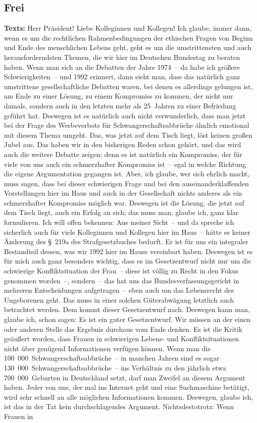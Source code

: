 \documentclass{article}
\begin{document}
\subsection{Frei}
\noindent\textbf{Texts:} Herr Präsident! Liebe Kolleginnen und Kollegen! Ich glaube, immer dann, wenn es um die rechtlichen Rahmenbedingungen der ethischen Fragen von Beginn und Ende des menschlichen Lebens geht, geht es um die umstrittensten und auch herausforderndsten Themen, die wir hier im Deutschen Bundestag zu beraten haben. Wenn man sich an die Debatten der Jahre 1974 – da habe ich größere Schwierigkeiten – und 1992 erinnert, dann sieht man, dass das natürlich ganz umstrittene gesellschaftliche Debatten waren, bei denen es allerdings gelungen ist, am Ende zu einer Lösung, zu einem Kompromiss zu kommen, der nicht nur damals, sondern auch in den letzten mehr als 25 Jahren zu einer Befriedung geführt hat. Deswegen ist es natürlich auch nicht verwunderlich, dass man jetzt bei der Frage des Werbeverbots für Schwangerschaftsabbrüche ähnlich emotional mit diesem Thema umgeht. Das, was jetzt auf dem Tisch liegt, löst keinen großen Jubel aus. Das haben wir in den bisherigen Reden schon gehört, und das wird auch die weitere Debatte zeigen; denn es ist natürlich ein Kompromiss, der für viele von uns auch ein schmerzhafter Kompromiss ist – egal in welche Richtung die eigene Argumentation gegangen ist. Aber, ich glaube, wer sich ehrlich macht, muss sagen, dass bei dieser schwierigen Frage und bei den auseinanderklaffenden Vorstellungen hier im Haus und auch in der Gesellschaft nichts anderes als ein schmerzhafter Kompromiss möglich war. Deswegen ist die Lösung, die jetzt auf dem Tisch liegt, auch ein Erfolg an sich; das muss man, glaube ich, ganz klar formulieren.  Ich will offen bekennen: Aus meiner Sicht – und da spreche ich sicherlich auch für viele Kolleginnen und Kollegen hier im Haus – hätte es keiner Änderung des § 219a des Strafgesetzbuches bedurft.  Er ist für uns ein integraler Bestandteil dessen, was wir 1992 hier im Hause vereinbart haben.  Deswegen ist es für mich auch ganz besonders wichtig, dass es im Gesetzentwurf nicht nur um die schwierige Konfliktsituation der Frau – diese ist völlig zu Recht in den Fokus genommen worden –, sondern – das hat uns das Bundesverfassungsgericht in mehreren Entscheidungen aufgetragen – eben auch um das Lebensrecht des Ungeborenen geht. Das muss in einer solchen Güterabwägung letztlich auch betrachtet werden. Dem kommt dieser Gesetzentwurf nach. Deswegen kann man, glaube ich, schon sagen: Es ist ein guter Gesetzentwurf.  Wir müssen an der einen oder anderen Stelle das Ergebnis durchaus vom Ende denken. Es ist die Kritik geäußert worden, dass Frauen in schwierigen Lebens- und Konfliktsituationen nicht über genügend Informationen verfügen können. Wenn man die 100 000 Schwangerschaftsabbrüche – in manchen Jahren sind es sogar 130 000 Schwangerschaftsabbrüche – ins Verhältnis zu den jährlich etwa 700 000 Geburten in Deutschland setzt, darf man Zweifel an diesem Argument haben. Jeder von uns, der mal ins Internet geht und eine Suchmaschine betätigt, wird sehr schnell an alle möglichen Informationen kommen. Deswegen, glaube ich, ist das in der Tat kein durchschlagendes Argument. Nichtsdestotrotz: Wenn Frauen in 
\end{document}
